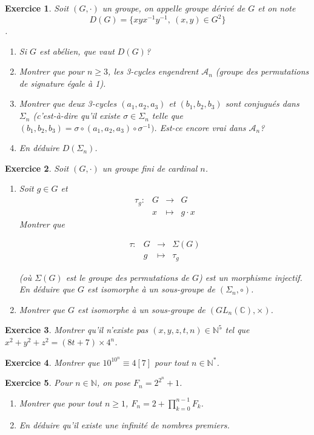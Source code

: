 \documentclass[12pt]{article}
\newtheorem{exercise}{Exercice}[section]
\theoremstyle{remark}
\theoremstyle{remark}
\newcommand{\C}{\mathbb{C}} \newcommand{\Q}{\mathbb{Q}}
\newcommand{\N}{\mathbb{N}} \newcommand{\Z}{\mathbb{Z}}
\newcommand{\function}[5]{
	$$
	\begin{array}{rccl}
		#1: & #2 & \to & #3 \\
		& #4 & \mapsto & #5
	\end{array}
	$$
}
\begin{document}
\begin{exercise}
	Soit $(G,\cdot)$ un groupe, on appelle groupe dérivé de $G$ et on note
	$$D(G)=\{xyx^{-1}y^{-1},~(x,y)\in G^{2}\}$$.
	\begin{enumerate}
		\item
		Si $G$ est abélien, que vaut $D(G)$?
		\item
		Montrer que pour $n\geqslant3$, les 3-cycles engendrent $\mathcal{A}_{n}$
		(groupe des permutations de signature égale à 1).
		\item
		Montrer que deux 3-cycles $(a_{1},a_{2},a_{3})$ et $(b_{1},b_{2},b_{3})$
		sont conjugués dans $\Sigma_{n}$ (c'est-à-dire qu'il existe
		$\sigma\in\Sigma_{n}$ telle que
		$(b_{1},b_{2},b_{3})=\sigma\circ(a_{1},a_{2},a_{3})\circ\sigma^{-1})$.
		Est-ce encore vrai dans $\mathcal{A}_{n}$?
		\item
		En déduire $D(\Sigma_{n})$.
	\end{enumerate}
\end{exercise}

\begin{exercise}
	Soit $(G,\cdot)$ un groupe fini de cardinal $n$.
	\begin{enumerate}
		\item
		Soit $g\in G$ et \function{\tau_g}{G}{G}{x}{g\cdot x} Montrer que
		\function{\tau}{G}{\Sigma(G)}{g}{\tau_g}
		(où $\Sigma(G)$ est le groupe des permutations de $G$) est un morphisme
		injectif. En déduire que $G$ est isomorphe à un sous-groupe de
		$(\Sigma_{n},\circ)$.
		\item
		Montrer que $G$ est isomorphe à un sous-groupe de $(GL_{n}(\C),\times)$.
	\end{enumerate}
\end{exercise}

\begin{exercise}
	Montrer qu'il n'existe pas $(x,y,z,t,n)\in \N^{5}$ tel que
	$x^{2}+y^{2}+z^{2}=(8t+7)\times 4^{n}$.
\end{exercise}

\begin{exercise}
	Montrer que $10^{10^{n}}\equiv 4 [7]$ pour tout $n\in\N^{*}$.
\end{exercise}

\begin{exercise}
	Pour $n\in\N$, on pose $F_{n}=2^{2^{n}}+1$.
	\begin{enumerate}
		\item
		Montrer que pour tout $n\geqslant1$, $F_{n}=2+\prod_{k=0}^{n-1}F_{k}$.
		\item
		En déduire qu'il existe une infinité de nombres premiers.
	\end{enumerate}
\end{exercise}
\end{document}
